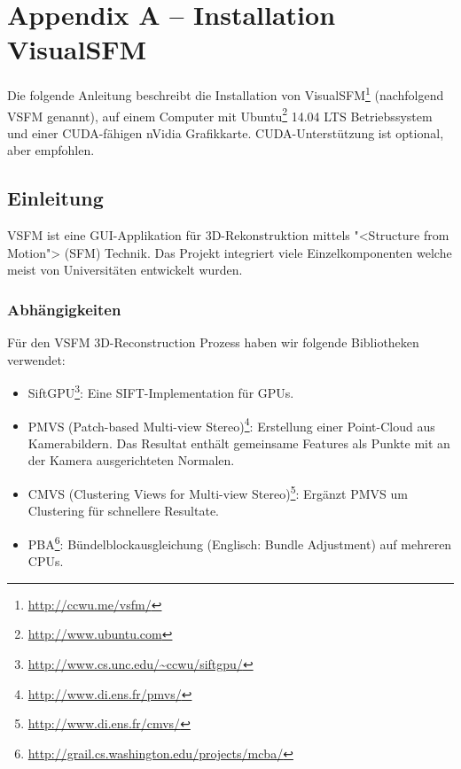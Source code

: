 \chapter{Appendix A -- Installation VisualSFM}

\label{ch:installing-vsfm}


Die folgende Anleitung beschreibt die Installation von
VisualSFM\footnote{\url{http://ccwu.me/vsfm/}} (nachfolgend VSFM genannt), auf
einem Computer mit Ubuntu\footnote{\url{http://www.ubuntu.com}} 14.04 LTS
Betriebssystem und einer CUDA-fähigen nVidia Grafikkarte. CUDA-Unterstützung ist 
optional, aber empfohlen.


\section{Einleitung}

VSFM ist eine GUI-Applikation für 3D-Rekonstruktion mittels "<Structure from
Motion"> (SFM) Technik. Das Projekt integriert viele Einzelkomponenten welche
meist von Universitäten entwickelt wurden.

\subsection{Abhängigkeiten}

Für den VSFM 3D-Reconstruction Prozess haben wir folgende Bibliotheken verwendet:

\begin{itemize}
	\item SiftGPU\footnote{\url{http://www.cs.unc.edu/~ccwu/siftgpu/}}:
		Eine SIFT\cite{lowe:2004}-Implementation für GPUs.
	\item PMVS (Patch-based Multi-view Stereo)\footnote{\url{http://www.di.ens.fr/pmvs/}}:
		Erstellung einer Point-Cloud aus Kamerabildern.
		Das Resultat enthält gemeinsame Features als
		Punkte mit an der Kamera ausgerichteten Normalen.
	\item CMVS (Clustering Views for Multi-view Stereo)\footnote{\url{http://www.di.ens.fr/cmvs/}}:
		Ergänzt PMVS um Clustering für schnellere Resultate.
	\item PBA\footnote{\url{http://grail.cs.washington.edu/projects/mcba/}}:
		Bündelblockausgleichung (Englisch: Bundle Adjustment) auf mehreren CPUs.
\end{itemize}

